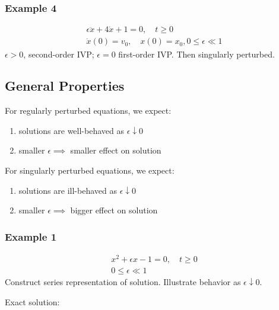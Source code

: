 \documentclass[12pt]{article}
\begin{document}
\subsubsection{Example 4}
\begin{equation*}
  \begin{aligned}
    \epsilon\ddot{x}+4\dot{x}+1=0,\quad t\ge0 \\
    \dot{x}(0)=v_0,\quad x(0)=x_0,
    0\le\epsilon\ll1
  \end{aligned}
\end{equation*}
$\epsilon>0$, second-order IVP; $\epsilon=0$ first-order IVP. Then singularly
perturbed.

\subsection{General Properties}
For regularly perturbed equations, we expect:
\begin{enumerate}
\item solutions are well-behaved as $\epsilon\downarrow 0$
\item smaller $\epsilon\implies$ smaller effect on solution
\end{enumerate}
For singularly perturbed equations, we expect:
\begin{enumerate}
\item solutions are ill-behaved as $\epsilon\downarrow 0$
\item smaller $\epsilon\implies$ bigger effect on solution
\end{enumerate}

\subsubsection{Example 1}
\begin{equation*}
  \begin{aligned}
    x^2+\epsilon x-1=0,\quad t\ge0 \\
    0\le\epsilon\ll1
  \end{aligned}
\end{equation*}
Construct series representation of solution. Illustrate behavior as
$\epsilon\downarrow 0$.

Exact solution:
\end{document}
